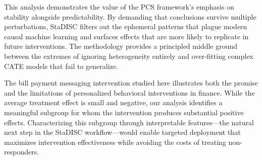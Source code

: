 \documentclass[11pt,a4paper]{article}
\begin{document}
This analysis demonstrates the value of the PCS framework's emphasis on stability alongside predictability. By demanding that conclusions survive multiple perturbations, StaDISC filters out the ephemeral patterns that plague modern causal machine learning and surfaces effects that are more likely to replicate in future interventions. The methodology provides a principled middle ground between the extremes of ignoring heterogeneity entirely and over-fitting complex CATE models that fail to generalize.

The bill payment messaging intervention studied here illustrates both the promise and the limitations of personalized behavioral interventions in finance. While the average treatment effect is small and negative, our analysis identifies a meaningful subgroup for whom the intervention produces substantial positive effects. Characterizing this subgroup through interpretable features---the natural next step in the StaDISC workflow---would enable targeted deployment that maximizes intervention effectiveness while avoiding the costs of treating non-responders.



	
\end{document}
